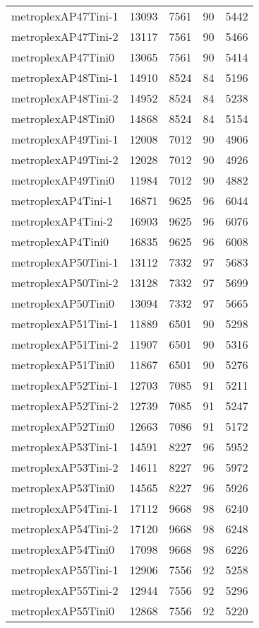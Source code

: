\begin{longtable}{lrrrr}
metroplexAP47Tini-1 & 13093 & 7561 & 90 & 5442 \\
metroplexAP47Tini-2 & 13117 & 7561 & 90 & 5466 \\
metroplexAP47Tini0 & 13065 & 7561 & 90 & 5414 \\
metroplexAP48Tini-1 & 14910 & 8524 & 84 & 5196 \\
metroplexAP48Tini-2 & 14952 & 8524 & 84 & 5238 \\
metroplexAP48Tini0 & 14868 & 8524 & 84 & 5154 \\
metroplexAP49Tini-1 & 12008 & 7012 & 90 & 4906 \\
metroplexAP49Tini-2 & 12028 & 7012 & 90 & 4926 \\
metroplexAP49Tini0 & 11984 & 7012 & 90 & 4882 \\
metroplexAP4Tini-1 & 16871 & 9625 & 96 & 6044 \\
metroplexAP4Tini-2 & 16903 & 9625 & 96 & 6076 \\
metroplexAP4Tini0 & 16835 & 9625 & 96 & 6008 \\
metroplexAP50Tini-1 & 13112 & 7332 & 97 & 5683 \\
metroplexAP50Tini-2 & 13128 & 7332 & 97 & 5699 \\
metroplexAP50Tini0 & 13094 & 7332 & 97 & 5665 \\
metroplexAP51Tini-1 & 11889 & 6501 & 90 & 5298 \\
metroplexAP51Tini-2 & 11907 & 6501 & 90 & 5316 \\
metroplexAP51Tini0 & 11867 & 6501 & 90 & 5276 \\
metroplexAP52Tini-1 & 12703 & 7085 & 91 & 5211 \\
metroplexAP52Tini-2 & 12739 & 7085 & 91 & 5247 \\
metroplexAP52Tini0 & 12663 & 7086 & 91 & 5172 \\
metroplexAP53Tini-1 & 14591 & 8227 & 96 & 5952 \\
metroplexAP53Tini-2 & 14611 & 8227 & 96 & 5972 \\
metroplexAP53Tini0 & 14565 & 8227 & 96 & 5926 \\
metroplexAP54Tini-1 & 17112 & 9668 & 98 & 6240 \\
metroplexAP54Tini-2 & 17120 & 9668 & 98 & 6248 \\
metroplexAP54Tini0 & 17098 & 9668 & 98 & 6226 \\
metroplexAP55Tini-1 & 12906 & 7556 & 92 & 5258 \\
metroplexAP55Tini-2 & 12944 & 7556 & 92 & 5296 \\
metroplexAP55Tini0 & 12868 & 7556 & 92 & 5220 \\

\end{longtable}
